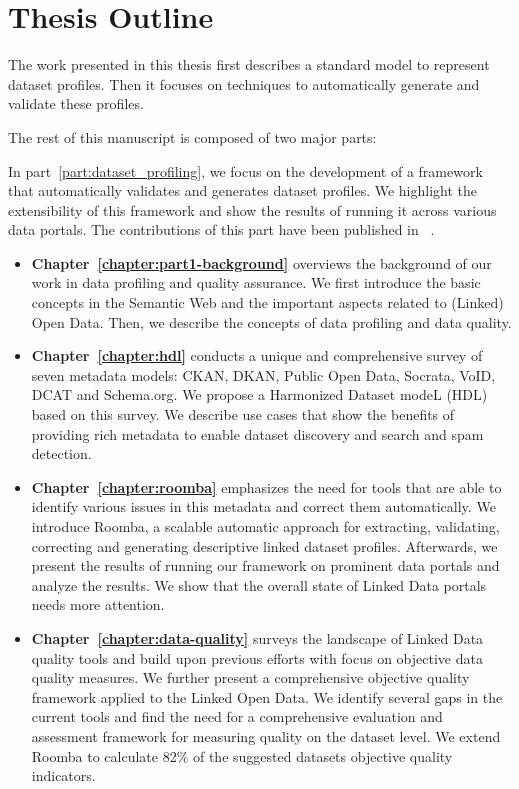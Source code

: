 \section{Thesis Outline} \label{section:outline}
The work presented in this thesis first describes a standard model to represent dataset profiles. Then it focuses on techniques to automatically generate and validate these profiles.

The rest of this manuscript is composed of two major parts:

In part~\ref{part:dataset_profiling}, we focus on the development of a framework that automatically validates and generates dataset profiles. We highlight the extensibility of this framework and show the results of running it across various data portals. The contributions of this part have been published in ~\cite{Assaf:DQMST:12,Assaf:WWW:15,Assaf:IJSWIS:15,Assaf:PROFILES:15,Assaf:ESWC:PROFILES:15,Assaf:ESWC:LDQ:15}.

\begin{itemize}
  \item \textbf{Chapter~\ref{chapter:part1-background}} overviews the background of our work in data profiling and quality assurance. We first introduce the basic concepts in the Semantic Web and the important aspects related to (Linked) Open Data. Then, we describe the concepts of data profiling and data quality.
	\item \textbf{Chapter~\ref{chapter:hdl}} conducts a unique and comprehensive survey of seven metadata models: CKAN, DKAN, Public Open Data, Socrata, VoID, DCAT and Schema.org. We propose a Harmonized Dataset modeL (HDL) based on this survey. We describe use cases that show the benefits of providing rich metadata to enable dataset discovery and search and spam detection.
	\item \textbf{Chapter~\ref{chapter:roomba}} emphasizes the need for tools that are able to identify various issues in this metadata and correct them automatically. We introduce Roomba, a scalable automatic approach for extracting, validating, correcting and generating descriptive linked dataset profiles. Afterwards, we present the results of running our framework on prominent data portals and analyze the results. We show that the overall state of Linked Data portals needs more attention.
	\item \textbf{Chapter~\ref{chapter:data-quality}} surveys the landscape of Linked Data quality tools and build upon previous efforts with focus on objective data quality measures. We further present a comprehensive objective quality framework applied to the Linked Open Data. We identify several gaps in the current tools and find the need for a comprehensive evaluation and assessment framework for measuring quality on the dataset level. We extend Roomba to calculate 82\% of the suggested datasets objective quality indicators.
\end{itemize}

